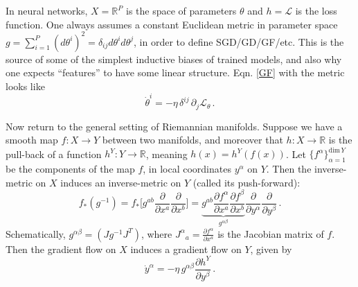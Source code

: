 \documentclass[11pt]{article}
\newcommand{\R}{\mathbb{R}}
\newcommand{\CL}{{\mathcal L}}
\begin{document}
In neural networks, $X=\R^P$ is the space of parameters $\theta$ and $h = \CL$ is the loss function. One always assumes a constant Euclidean metric in parameter space $g = \sum_{i=1}^P (d\theta^i)^2 = \delta_{ij}d\theta^i d\theta^j$, in order to define SGD/GD/GF/etc. This is the source of some of the simplest inductive biases of trained models, and also why one expects ``features'' to have some linear structure. Eqn. \eqref{GF} with the metric looks like
%
\begin{equation}
    \dot\theta^i  = -\eta\, \delta^{ij}\, \partial_j \CL_\theta\,.
\end{equation}

Now return to the general setting of Riemannian manifolds. Suppose we have a smooth map $f : X \to Y$ between two manifolds, and moreover that $h:X\to \R$ is the pull-back of a function $h^Y:Y\to \R$, meaning $h(x) = h^Y(f(x))$. Let $\{f^\alpha\}_{\alpha=1}^{\text{dim}\, Y}$ be the components of the map $f$, in local coordinates $y^\alpha$ on $Y$. Then the inverse-metric on $X$ induces an inverse-metric on $Y$ (called its push-forward):
%
\begin{equation}
    f_*(g^{-1}) = f_*\bigg[g^{ab} \frac{\partial}{\partial x^a}\frac\partial{\partial x^b}\bigg] = \underbrace{g^{ab} \frac{\partial f^\alpha}{\partial x^a} \frac{\partial f^\beta}{\partial x^b}}_{g^{\alpha \beta}} \frac{\partial}{\partial y^\alpha} \frac{\partial}{\partial y^\beta}\,.
\end{equation}
%
Schematically, $g^{\alpha\beta} = (J g^{-1} J^T)$, where $J^{\alpha}{}_a = \frac{\partial f^\alpha}{\partial x^a}$ is the Jacobian matrix of $f$. Then the gradient flow on $X$ induces a gradient flow on $Y$, given by
%
\begin{equation} \dot y^\alpha = -\eta\, g^{\alpha\beta} \frac{\partial h^Y}{\partial y^\beta}\,. \end{equation}
\end{document}
